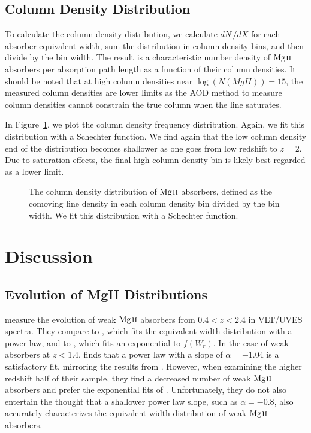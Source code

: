 \documentclass[iop,apj,numberedappendix,appendixfloats,twocolappendix]{emulateapj}
\begin{document}
\subsection{Column Density Distribution}
\label{sec:logndistro}

To calculate the column density distribution, we calculate $dN\,/dX$ for each absorber equivalent width, sum the distribution in column density bins, and then divide by the bin width. The result is a characteristic number density of ${\hbox{{\rm Mg}\kern 0.1em{\sc ii}}}$ absorbers per absorption path length as a function of their column densities. It should be noted that at high column densities near $\log (N(MgII)) = 15$, the measured column densities are lower limits as the AOD method to measure column densities cannot constrain the true column when the line saturates.

In Figure~\ref{fig:logndistro}, we plot the column density frequency distribution. Again, we fit this distribution with a Schechter function. We find again that the low column density end of the distribution becomes shallower as one goes from low redshift to $z = 2$. Due to saturation effects, the final high column density bin is likely best regarded as a lower limit. 

\begin{figure*}[bth]
\caption{The column density distribution of ${\hbox{{\rm Mg}\kern 0.1em{\sc ii}}}$ absorbers, defined as the comoving line density in each column density bin divided by the bin width. We fit this distribution with a Schechter function.}
\label{fig:logndistro}
\end{figure*}


\section{Discussion}
\label{sec:discussion}

\subsection{Evolution of MgII Distributions}

\cite{Narayanan2007} measure the evolution of weak ${\hbox{{\rm Mg}\kern 0.1em{\sc ii}}}$ absorbers from $0.4 < z < 2.4$ in VLT/UVES spectra. They compare to \cite{Churchill1999}, which fits the equivalent width distribution with a power law, and to \cite{Nestor2005}, which fits an exponential to $f(W_r)$. In the case of weak absorbers at $z < 1.4$, \cite{Narayanan2007} finds that a power law with a slope of $\alpha = -1.04$ is a satisfactory fit, mirroring the results from \cite{Churchill1999}. However, when examining the higher redshift half of their sample, they find a decreased number of weak ${\hbox{{\rm Mg}\kern 0.1em{\sc ii}}}$ absorbers and prefer the exponential fits of \cite{Nestor2005}. Unfortunately, they do not also entertain the thought that a shallower power law slope, such as $\alpha = -0.8$, also accurately characterizes the equivalent width distribution of weak ${\hbox{{\rm Mg}\kern 0.1em{\sc ii}}}$ absorbers. 
\end{document}
